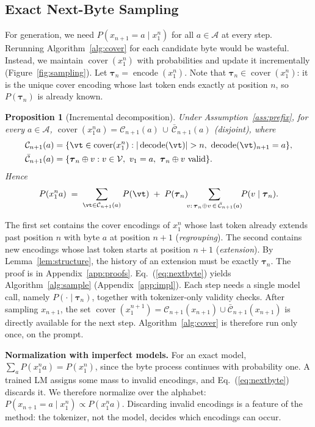 \documentclass{article} %
\newtheorem{proposition}{Proposition}
\newcommand{\enc}{\operatorname{encode}}
\newcommand{\dec}{\operatorname{decode}}
\newcommand{\cover}{\operatorname{cover}}
\newcommand{\vocab}{\mathcal{V}}
\newcommand{\alphabet}{\mathcal{A}}
\providecommand{\vtau}{\boldsymbol{\tau}}
\begin{document}
\subsection{Exact Next-Byte Sampling}
\label{sec:sampling}
For generation, we need $P(x_{n+1}=a\mid x_1^n)$ for all $a \in \alphabet$ at every step. Rerunning Algorithm~\ref{alg:cover} for each candidate byte would be wasteful. Instead, we maintain $\cover(x_1^n)$ with probabilities and update it incrementally (Figure~\ref{fig:sampling}). Let $\vtau_n = \enc(x_1^n)$. Note that $\vtau_n \in \cover(x_1^n)$: it is the unique cover encoding whose last token ends exactly at position $n$, so $P(\vtau_n)$ is already known.

\begin{proposition}[Incremental decomposition]
\label{prop:increment}
Under Assumption~\ref{ass:prefix}, for every $a \in \alphabet$, $\cover(x_1^n a) = \mathcal{C}_{n+1}(a) \,\cup\, \bar{\mathcal{C}}_{n+1}(a)$ (disjoint), where
\begin{align*}
\mathcal{C}_{n+1}(a) &= \{\vt \in \cover(x_1^n) : |\dec(\vt)| > n,\ \dec(\vt)_{n+1} = a\}, \\
\bar{\mathcal{C}}_{n+1}(a) &= \{\vtau_n \oplus v : v\in\vocab,\ v_1 = a,\ \vtau_n\oplus v \text{ valid}\}.
\end{align*}
Hence
\begin{equation}
P(x_1^n a) \;=\; \sum_{\vt \in \mathcal{C}_{n+1}(a)} P(\vt) \;+\; P(\vtau_n)\!\!\sum_{v:\, \vtau_n \oplus v\, \in\, \bar{\mathcal{C}}_{n+1}(a)}\!\! P(v \mid \vtau_n).
\label{eq:nextbyte}
\end{equation}
\end{proposition}

The first set contains the cover encodings of $x_1^n$ whose last token already extends past position $n$ with byte $a$ at position $n+1$ (\emph{regrouping}). The second contains new encodings whose last token starts at position $n+1$ (\emph{extension}). By Lemma~\ref{lem:structure}, the history of an extension must be exactly $\vtau_n$. The proof is in Appendix~\ref{app:proofs}. Eq.~(\ref{eq:nextbyte}) yields Algorithm~\ref{alg:sample} (Appendix~\ref{app:impl}). Each step needs a single model call, namely $P(\cdot\mid\vtau_n)$, together with tokenizer-only validity checks. After sampling $x_{n+1}$, the set $\cover(x_1^{n+1}) = \mathcal{C}_{n+1}(x_{n+1}) \cup \bar{\mathcal{C}}_{n+1}(x_{n+1})$ is directly available for the next step. Algorithm~\ref{alg:cover} is therefore run only once, on the prompt.

\textbf{Normalization with imperfect models.}
For an exact model, $\sum_a P(x_1^n a) = P(x_1^n)$, since the byte process continues with probability one. A trained LM assigns some mass to invalid encodings, and Eq.~(\ref{eq:nextbyte}) discards it. We therefore normalize over the alphabet: $P(x_{n+1} = a\mid x_1^n) \propto P(x_1^n a)$. Discarding invalid encodings is a feature of the method: the tokenizer, not the model, decides which encodings can occur.
\end{document}
